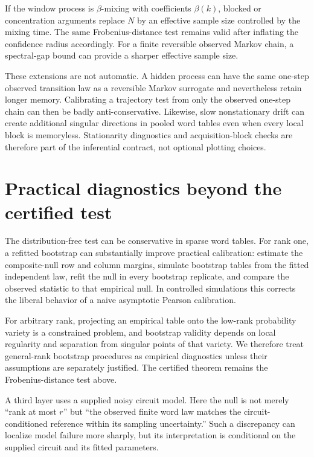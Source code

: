 \documentclass[11pt]{article}
\begin{document}
If the window process is $\beta$-mixing with coefficients $\beta(k)$, blocked or concentration arguments replace $N$ by an effective sample size controlled by the mixing time. The same Frobenius-distance test remains valid after inflating the confidence radius accordingly. For a finite reversible observed Markov chain, a spectral-gap bound can provide a sharper effective sample size.

These extensions are not automatic. A hidden process can have the same one-step observed transition law as a reversible Markov surrogate and nevertheless retain longer memory. Calibrating a trajectory test from only the observed one-step chain can then be badly anti-conservative. Likewise, slow nonstationary drift can create additional singular directions in pooled word tables even when every local block is memoryless. Stationarity diagnostics and acquisition-block checks are therefore part of the inferential contract, not optional plotting choices.

\section{Practical diagnostics beyond the certified test}
The distribution-free test can be conservative in sparse word tables. For rank one, a refitted bootstrap can substantially improve practical calibration: estimate the composite-null row and column margins, simulate bootstrap tables from the fitted independent law, refit the null in every bootstrap replicate, and compare the observed statistic to that empirical null. In controlled simulations this corrects the liberal behavior of a naive asymptotic Pearson calibration.

For arbitrary rank, projecting an empirical table onto the low-rank probability variety is a constrained problem, and bootstrap validity depends on local regularity and separation from singular points of that variety. We therefore treat general-rank bootstrap procedures as empirical diagnostics unless their assumptions are separately justified. The certified theorem remains the Frobenius-distance test above.

A third layer uses a supplied noisy circuit model. Here the null is not merely ``rank at most $r$'' but ``the observed finite word law matches the circuit-conditioned reference within its sampling uncertainty.'' Such a discrepancy can localize model failure more sharply, but its interpretation is conditional on the supplied circuit and its fitted parameters.
\end{document}
